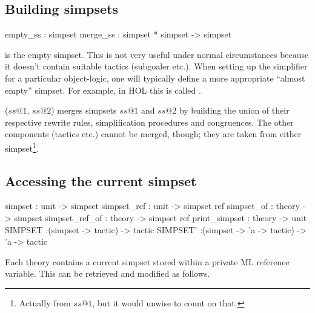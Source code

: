 \subsection{Building simpsets}
\begin{ttbox}
empty_ss : simpset
merge_ss : simpset * simpset -> simpset
\end{ttbox}
\begin{ttdescription}
  
\item[\ttindexbold{empty_ss}] is the empty simpset.  This is not very useful
  under normal circumstances because it doesn't contain suitable tactics
  (subgoaler etc.).  When setting up the simplifier for a particular
  object-logic, one will typically define a more appropriate ``almost empty''
  simpset.  For example, in HOL this is called .
  
\item[\ttindexbold{merge_ss} ($ss@1$, $ss@2$)] merges simpsets $ss@1$
  and $ss@2$ by building the union of their respective rewrite rules,
  simplification procedures and congruences.  The other components
  (tactics etc.) cannot be merged, though; they are taken from either
  simpset\footnote{Actually from $ss@1$, but it would unwise to count
    on that.}.

\end{ttdescription}


\subsection{Accessing the current simpset}
\label{sec:access-current-simpset}

\begin{ttbox}
simpset        : unit   -> simpset
simpset_ref    : unit   -> simpset ref
simpset_of     : theory -> simpset
simpset_ref_of : theory -> simpset ref
print_simpset  : theory -> unit
SIMPSET        :(simpset ->       tactic) ->       tactic
SIMPSET'       :(simpset -> 'a -> tactic) -> 'a -> tactic
\end{ttbox}

Each theory contains a current simpset stored
within a private ML reference variable.  This can be retrieved and
modified as follows.

